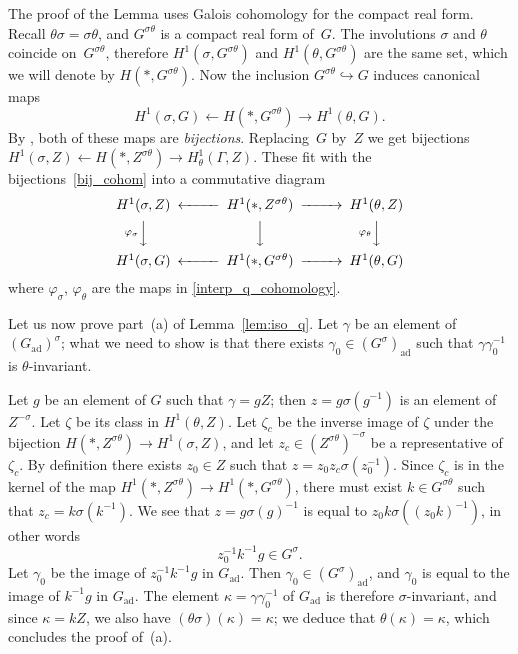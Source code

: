 \documentclass[cupthm]{CUP-JNL-JMJ}
\numberwithin{equation}{section}
\theoremstyle{cupplain}
\theoremstyle{cupdefinition}
\theoremstyle{cupremark}
\theoremstyle{cupproof}
\newcommand{\ad}{\mathrm{ad}}
\newcommand{\Gad}{G_\mathrm{ad}}
\begin{document}
The proof of the Lemma uses Galois cohomology for the compact real form.  Recall $\theta\sigma = \sigma\theta$, and $G^{\sigma\theta}$ is a compact real form of~$G$. 
The involutions $\sigma$ and $\theta$ coincide on~$G^{\sigma\theta}$,
therefore  $H^1(\sigma, G^{\sigma\theta})$ and  $H^1(\theta, G^{\sigma\theta})$ are the same set,
which we will denote by  $H(\ast, G^{\sigma\theta})$.
Now the inclusion $G^{\sigma\theta} \hookrightarrow G$ induces canonical maps 
\begin{equation} \label{bij_cohom} H^{1}(\sigma,  G) \longleftarrow H(\ast, G^{\sigma\theta}) \longrightarrow H^{1}(\theta,  G).\end{equation}
By \cite[Corollary~4.4 and Corollary 4.7]{galois}, both of these maps are \emph{bijections}.
Replacing~$G$ by~$Z$ we get bijections $H^{1}(\sigma, Z) \leftarrow H(\ast, Z^{\sigma\theta}) \rightarrow H^{1}_{\theta}(\Gamma, Z)$.
These fit with the bijections~\eqref{bij_cohom} into a commutative diagram
\[
\begin{CD}
H^{1}(\sigma, Z) @<<< H^1(\ast, Z^{\sigma\theta})@>>> H^{1}(\theta, Z)
 \\
@V{\varphi_{\sigma}}VV @VVV @V{\varphi_{\theta}}VV  \\
H^{1}(\sigma, G) @<<< H^1(\ast, G^{\sigma\theta})@>>> H^{1}(\theta,  G)
\end{CD}
\]
where $\varphi_\sigma$, $\varphi_\theta$ are the maps in \eqref{interp_q_cohomology}.

Let us now prove part~(a) of Lemma~\ref{lem:iso_q}. Let $\gamma$ be an element of $(\Gad)^\sigma$; what we need to show is that there exists $\gamma_0 \in (G^\sigma)_{\ad}$ such that $\gamma \gamma_0^{-1}$ is $\theta$-invariant. 

Let $g$ be an element of $G$ such that $\gamma = gZ$; then $z=g \sigma(g^{-1})$ is an element of~$Z^{-\sigma}$. Let $\zeta$ be its class in $H^{1}(\theta, Z)$. Let $\zeta_c$ be the inverse image of $\zeta$ under the bijection $H(\ast, Z^{\sigma\theta})\to H^{1}(\sigma, Z) $, and let $z_c\in (Z^{\sigma\theta})^{-\sigma}$ be a representative of $\zeta_c$. By definition there exists $z_0 \in Z$ such that $z = z_0 z_c \sigma(z_0^{-1})$. Since $\zeta_c$ is in the kernel of the map $H^1(\ast, Z^{\sigma\theta}) \to H^1(\ast, G^{\sigma\theta})$, there must exist  $k \in G^{\sigma\theta}$  such that $z_c = k \sigma(k^{-1})$. We see that $z = g \sigma(g)^{-1}$ is equal to $z_0 k \sigma((z_0k)^{-1})$, in other words 
\[ z_0^{-1} k^{-1} g \in G^{\sigma}.\]
Let $\gamma_0$ be the image of $z_0^{-1} k^{-1} g$ in $\Gad$. Then $\gamma_0 \in (G^{\sigma})_\ad$, and $\gamma_0$ is equal to the image of $k^{-1} g$ in $\Gad$. The element $\kappa=\gamma \gamma_0^{-1}$ of $\Gad$  is therefore $\sigma$-invariant, and since $\kappa=kZ$, we also have $(\theta\sigma)(\kappa)=\kappa$; we deduce that $\theta(\kappa) = \kappa$, which concludes the proof of~(a). 
\end{document}
